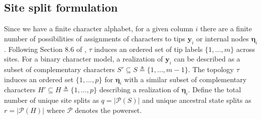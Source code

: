 \documentclass[a4paper]{article}
\newcommand{\alignmentColumn}{\mathbf{y}}
\newcommand{\siteSplit}{S'}
\newcommand{\sitePatternSet}{S}
\newcommand{\ancestralStateColumn}{\boldsymbol\eta}
\newcommand{\ancestralStateCategory}{Z}
\newcommand{\ancestralSplit}{H'}
\newcommand{\ancestralStateSet}{H}
\newcommand{\nSiteRows}{m}
\newcommand{\nAncestralStateRows}{p}
\newcommand{\nSiteSplits}{q}
\newcommand{\nAncestralSplits}{r}
\begin{document}
\subsection{Site split formulation}

Since we have a finite character alphabet, for a given column $i$ there are a finite number of possibilities of assignments of characters to tips $\alignmentColumn_i$ or internal nodes $\ancestralStateColumn_i$.
Following Section 8.6 of \cite{Semple2003-em}, $\tau$ induces an ordered set of tip labels $\{1,\ldots,\nSiteRows\}$ across sites.
For a binary character model, a realization of $\alignmentColumn_i$ can be described as a subset of complementary characters $\siteSplit\subseteq\sitePatternSet\triangleq\{1,\ldots,\nSiteRows-1\}$.
The topology $\tau$ induces an ordered set $\{1,\ldots,\nAncestralStateRows\}$ for $\ancestralStateColumn_i$ with a similar subset of complementary characters $\ancestralSplit\subseteq\ancestralStateSet\triangleq\{1,\ldots,\nAncestralStateRows\}$ describing a realization of $\ancestralStateColumn_i$.
Define the total number of unique site splits as $\nSiteSplits=|\mathcal{P}(\sitePatternSet)|$ and unique ancestral state splits as $\nAncestralSplits=|\mathcal{P}(\ancestralStateSet)|$ where $\mathcal{P}$ denotes the powerset.

\end{document}
